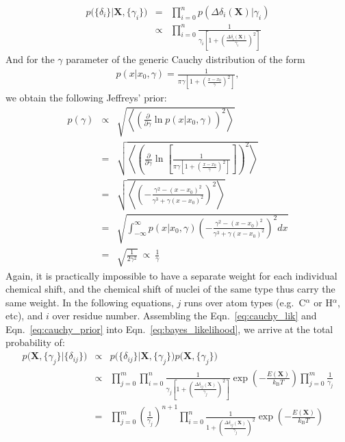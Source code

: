 \begin{eqnarray}
    p\Big( \{\delta_i\} \Big| \mathbf X, \{\gamma_i\}\Big) 
    & = & \prod_{i=0}^{n} p\left( \Delta\delta_i (\mathbf X)| \gamma_i \right)\nonumber\\
    & \propto & \prod_{i=0}^{n} \frac{1}{\gamma_i \left[ 1+ \left(\frac{\Delta\delta_{i}(\mathbf X)}{\gamma_i}\right)^2\right]}
    \label{eq:cauchy_lik}
\end{eqnarray}
And for the $\gamma$ parameter of the generic Cauchy distribution of the form
\begin{eqnarray}
    p(x|x_0, \gamma) = \frac{1}{\pi\gamma\left[ 1 + \left(\frac{x-x_0}{\gamma} \right)^2\right]},
\end{eqnarray}
we obtain the following Jeffreys' prior:
\begin{eqnarray}
p(\gamma)
& \propto & \sqrt{\left\langle \left( \frac{\partial}{\partial\gamma}
    \ln p(x|x_0, \gamma) \right)^2 \right\rangle}\nonumber\\
& = & \sqrt{\left\langle \left( \frac{\partial}{\partial\gamma}
\ln \left[\frac{1}{\pi\gamma\left[ 1 + \left(\frac{x-x_0}{\gamma} \right)^2\right]} \right] \right)^2 \right\rangle}\nonumber\\
& = & \sqrt{\left\langle \left( -\frac{\gamma^2 - (x-x_0)^2}{\gamma^3 +\gamma(x-x_0)^2} \right)^2 \right\rangle }\nonumber\\
& = & \sqrt{\int^{\infty}_{-\infty}  p(x|x_0, \gamma) \left(  -\frac{\gamma^2 - (x-x_0)^2}{\gamma^3 +\gamma(x-x_0)^2}\right)^2 dx }\nonumber\\
& = & \sqrt{\frac{1}{2\gamma^2}} \ \propto \ \frac{1}{\gamma} 
\label{eq:cauchy_prior}
\end{eqnarray}
Again, it is practically impossible to have a separate weight for each individual chemical shift, and the chemical shift of nuclei of the same type thus carry the same weight.
In the following equations, $j$ runs over atom types (e.g.~C$^\alpha$ or H$^\alpha$, etc), and $i$ over residue number.
Assembling the Eqn.~\ref{eq:cauchy_lik} and Eqn.~\ref{eq:cauchy_prior} into Eqn.~\ref{eq:bayes_likelihood}, we arrive at the total probability of:
\begin{eqnarray}
    p\Big(\mathbf X, \{\gamma_j\} \Big| \{\delta_{ij}\} \Big) 
    &\propto& p\Big( \{\delta_{ij}\} \Big| \mathbf X, \{\gamma_j\}\Big)p\Big (\mathbf X, \{\gamma_j\} \Big) \nonumber\\
    &\propto&   \prod_{j=0}^{m} 
    \prod_{i=0}^{n} \frac{1}{\gamma_j \left[ 1+ \left(\frac{\Delta\delta_{ij}(\mathbf X)}{\gamma_j}\right)^2\right]}
    \exp{\left(-\frac{E(\mathbf X)}{k_\mathrm{B}T}\right)}
    \prod_{j=0}^{m} \frac{1}{\gamma_j}\nonumber\\
    &= &   \prod_{j=0}^{m} \left( \frac{1}{\gamma_j} \right)^{n + 1}
    \prod_{i=0}^{n} \frac{1}{ 1+ \left(\frac{\Delta\delta_{ij}(\mathbf X)}{\gamma_j}\right)^2}
    \exp{\left(-\frac{E(\mathbf X)}{k_\mathrm{B}T}\right)}
\end{eqnarray}\\
